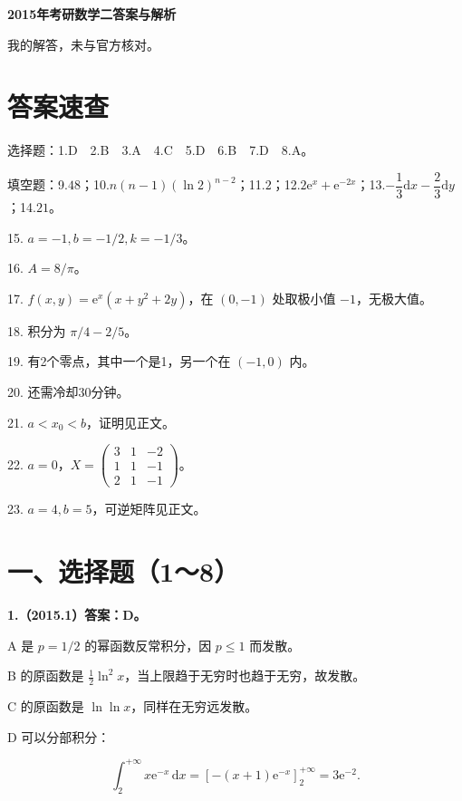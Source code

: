 \documentclass[UTF8,11pt,fontset=windows]{ctexart}
\begin{document}
{\LARGE\bfseries 2015年考研数学二答案与解析\par}\vspace{6pt}

\begingroup\color{gray}我的解答，未与官方核对。\par\endgroup

\section*{答案速查}

\begingroup\color{gray}选择题：1.D　2.B　3.A　4.C　5.D　6.B　7.D　8.A。\par\endgroup

\begingroup\color{gray}填空题：9.$48$；10.$n(n-1)(\ln2)^{n-2}$；11.$2$；12.$2\mathrm e^x+\mathrm e^{-2x}$；13.$-\dfrac13\mathrm dx-\dfrac23\mathrm dy$；14.$21$。\par\endgroup

15. $a=-1,b=-1/2,k=-1/3$。

16. $A=8/\pi$。

17. $f(x,y)=\mathrm e^x(x+y^2+2y)$，在 $(0,-1)$ 处取极小值 $-1$，无极大值。

18. 积分为 $\pi/4-2/5$。

19. 有2个零点，其中一个是1，另一个在 $(-1,0)$ 内。

20. 还需冷却30分钟。

21. $a<x_0<b$，证明见正文。

22. $a=0$，$X=\begin{pmatrix}3&1&-2\\1&1&-1\\2&1&-1\end{pmatrix}$。

23. $a=4,b=5$，可逆矩阵见正文。

\clearpage

\section*{一、选择题（1～8）}

\textbf{1.（2015.1）答案：D。}

A 是 $p=1/2$ 的幂函数反常积分，因 $p\le1$ 而发散。

B 的原函数是 $\frac12\ln^2x$，当上限趋于无穷时也趋于无穷，故发散。

C 的原函数是 $\ln\ln x$，同样在无穷远发散。

D 可以分部积分：

$$
\int_2^{+\infty}x\mathrm e^{-x}\,\mathrm dx
=\left[-(x+1)\mathrm e^{-x}\right]_2^{+\infty}
=3\mathrm e^{-2}.
$$
\end{document}
